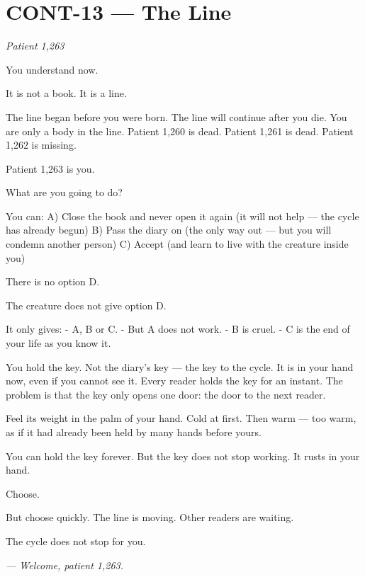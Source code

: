 \section*{\textbf{CONT-13} --- The Line}

\noindent \textit{Patient 1,263}

\noindent You understand now.

\noindent It is not a book.
It is a line.

\noindent The line began before you were born.
The line will continue after you die.
You are only a body in the line.
Patient 1,260 is dead.
Patient 1,261 is dead.
Patient 1,262 is missing.

\noindent Patient 1,263 is you.

\noindent What are you going to do?

\noindent You can:
A) Close the book and never open it again (it will not help --- the cycle has already begun)
B) Pass the diary on (the only way out --- but you will condemn another person)
C) Accept (and learn to live with the creature inside you)

\noindent There is no option D.

\noindent The creature does not give option D.

\noindent It only gives:
- A, B or C.
- But A does not work.
- B is cruel.
- C is the end of your life as you know it.

\noindent You hold the key. Not the diary's key --- the key to the cycle. It is in your hand now, even if you cannot see it. Every reader holds the key for an instant. The problem is that the key only opens one door: the door to the next reader.

\noindent Feel its weight in the palm of your hand. Cold at first. Then warm --- too warm, as if it had already been held by many hands before yours.

\noindent You can hold the key forever. But the key does not stop working. It rusts in your hand.

\noindent Choose.

\noindent But choose quickly.
The line is moving.
Other readers are waiting.

\noindent The cycle does not stop for you.

\noindent \textit{--- Welcome, patient 1,263.}

